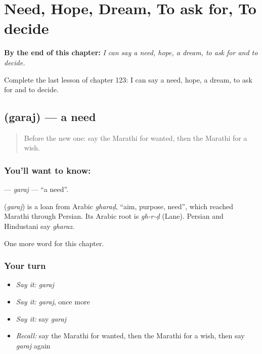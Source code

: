 
\chapter{Need, Hope, Dream, To ask for, To decide}
\label{ch:mr-need-hope-dream-to-ask-for-to-decide}

\begin{chapteropening}
\textbf{By the end of this chapter:} \emph{I can say a need, hope, a dream, to ask for and to decide.}

Complete the last lesson of chapter 123: I can say a need, hope, a dream, to ask for and to decide.
\end{chapteropening}

\section[\texorpdfstring{\mr{गरज} (garaj)}{गरज (garaj)}]{ (garaj) — a need}

\label{lesson:MR-C123-garaj}



\begin{quote}
Before the new one: say the Marathi for wanted, then the Marathi for a wish.
\end{quote}

\subsection*{You'll want to know: }
\textbf{} — \emph{garaj} — \textquotedblleft{}a need\textquotedblright{}.

\begin{cousinweb}
\textbf{} (\emph{garaj}) is a loan from Arabic \emph{gharaḍ}, \textquotedblleft{}aim, purpose, need\textquotedblright{}, which reached Marathi through Persian. Its Arabic root is \emph{gh-r-ḍ} (Lane). Persian and Hindustani say \emph{gharaz}.
\end{cousinweb}

\begin{grammarlens}[title={What you've built}]
One more word for this chapter.
\end{grammarlens}

\subsection*{Your turn}
\begin{itemize}
\raggedright
  \item \emph{Say it:} \emph{garaj}
  \item \emph{Say it:} \emph{garaj}, once more
  \item \emph{Say it:} say \emph{garaj}
  \item \emph{Recall:} say the Marathi for wanted, then the Marathi for a wish, then say \emph{garaj} again
\end{itemize}

